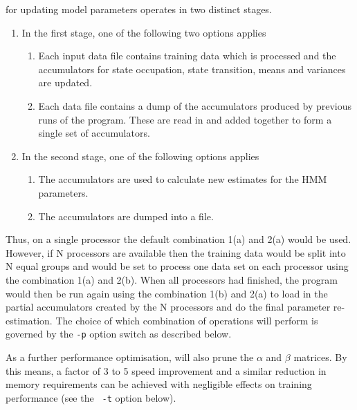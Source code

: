  for updating model parameters operates in two distinct stages. 

\begin{enumerate}

\item
    In the first stage, one of the following two options applies
 \begin{enumerate}
  \item        
    Each input data file contains training data which is 
    processed and the accumulators for state occupation, 
    state transition, means and variances are updated.
        
  \item      
    Each data file contains a dump of the accumulators
    produced by previous runs of the program.  These
    are read in and added together to form a single set
    of accumulators.
  \end{enumerate}

\item
   In the second stage, one of the following options applies
  \begin{enumerate}
    \item
         The accumulators are used to calculate new 
         estimates for the HMM parameters.
    \item
         The accumulators are dumped into a file.
  \end{enumerate}
\end{enumerate}

Thus, on a single processor the default combination 1(a) and 2(a) would
be used.  However, if N processors are available then the 
training data would be split into N equal groups and  would
be set to process one data set on each processor using the combination
1(a) and 2(b). 
When all processors had finished, the 
program would then be run again using the combination 1(b) and 2(a)
to load in the partial accumulators created by the N processors
and do the final parameter re-estimation.  The choice of which combination
of operations  will perform is governed by the {\tt -p} option
switch as described below.

As a further performance optimisation,  will also prune the
$\alpha$ and $\beta$ matrices.  By this means, a factor of 3 to 5
speed improvement and a similar reduction in memory requirements can be
achieved with negligible effects on training performance (see the {\tt
-t} option below).  

